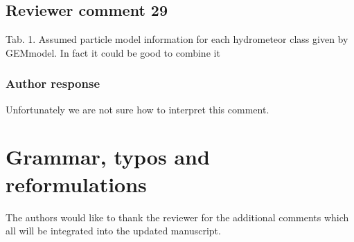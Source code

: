 \documentclass[11pt]{scrartcl}
\begin{document}
\subsection*{Reviewer comment 29}
Tab. 1. Assumed particle model information for each hydrometeor class given by GEMmodel. In fact it could be good to combine it

\subsubsection*{Author response}
Unfortunately we are not sure how to interpret this comment.

\section*{Grammar, typos and reformulations}

The authors would like to thank the reviewer for the additional comments which all
will be integrated into the updated manuscript.




\end{document}
